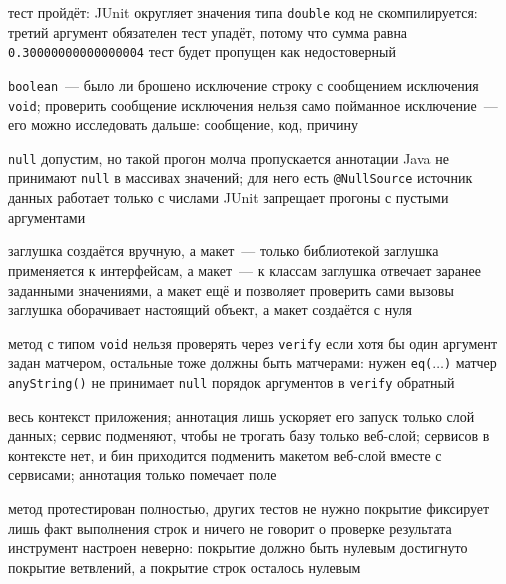 \begin{enumerate}
  {тест пройдёт: JUnit округляет значения типа \texttt{double}}
  {код не скомпилируется: третий аргумент обязателен}
  {тест упадёт, потому что сумма равна \texttt{0.30000000000000004}}
  {тест будет пропущен как недостоверный}

  {\texttt{boolean}~--- было ли брошено исключение}
  {строку с сообщением исключения}
  {\texttt{void}; проверить сообщение исключения нельзя}
  {само пойманное исключение~--- его можно исследовать дальше: сообщение, код, причину}

  {\texttt{null} допустим, но такой прогон молча пропускается}
  {аннотации Java не принимают \texttt{null} в массивах значений; для него есть \texttt{@NullSource}}
  {источник данных работает только с числами}
  {JUnit запрещает прогоны с пустыми аргументами}

  {заглушка создаётся вручную, а макет~--- только библиотекой}
  {заглушка применяется к интерфейсам, а макет~--- к классам}
  {заглушка отвечает заранее заданными значениями, а макет ещё и позволяет проверить сами вызовы}
  {заглушка оборачивает настоящий объект, а макет создаётся с нуля}

  {метод с типом \texttt{void} нельзя проверять через \texttt{verify}}
  {если хотя бы один аргумент задан матчером, остальные тоже должны быть матчерами: нужен \texttt{eq($\ldots$)}}
  {матчер \texttt{anyString()} не принимает \texttt{null}}
  {порядок аргументов в \texttt{verify} обратный}

  {весь контекст приложения; аннотация лишь ускоряет его запуск}
  {только слой данных; сервис подменяют, чтобы не трогать базу}
  {только веб-слой; сервисов в контексте нет, и бин приходится подменить макетом}
  {веб-слой вместе с сервисами; аннотация только помечает поле}

  {метод протестирован полностью, других тестов не нужно}
  {покрытие фиксирует лишь факт выполнения строк и ничего не говорит о проверке результата}
  {инструмент настроен неверно: покрытие должно быть нулевым}
  {достигнуто покрытие ветвлений, а покрытие строк осталось нулевым}

\end{enumerate}
